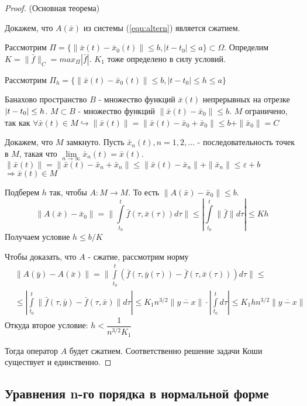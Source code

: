	\begin{proof}
		(Основная теорема)
		
		Докажем, что $A(\bar{x})$ из системы (\ref{equ:altern}) является сжатием.
		
		Рассмотрим $\Pi = \{\|\bar{x}(t) - \bar{x}_0(t)\| \le b, |t-t_0| \le a   \} \subset \Omega$. Определим $K = \|\bar{f}\|_C = max_{\Pi}|\bar{f}|$. $K_1$ тоже определено в силу условий.
		
		Рассмотрим $\Pi_h = \{\|\bar{x}(t) - \bar{x}_0(t)\| \le b, |t-t_0| \le h \le a   \}$
		
		Банахово пространство $B$ - множество функций $\bar{x}(t)$ непрерывных на отрезке $|t-t_0|\hm\le h$. $M \subset B$ - множество функций $\|\bar{x}(t) - \bar{x}_0\| \le b$. $M$ ограничено, так как $\forall \bar{x}(t) \in M \hookrightarrow \|\bar{x}(t)\| = \|\bar{x}(t) - \bar{x}_0 + \bar{x}_0\| \le b + \|\bar{x}_0\| = C$
		
		Докажем, что $M$ замкнуто. Пусть $\bar{x}_n(t), n = 1, 2, \dots$ - последовательность точек в $M$, такая что $\lim\limits_{n\to \infty} \bar{x}_n(t) = \bar{x}(t)$. $\|\bar{x}(t)\| = \|\bar{x}(t) - \bar{x}_n + \bar{x}_n\| \le \|\bar{x}(t) - \bar{x}_n\| + \|\bar{x}_n\| \le \varepsilon + b$ $\Rightarrow \bar{x}(t) \in M$
		
		Подберем $h$ так, чтобы $A:M\to M$. То есть $\|A(\bar{x}) - \bar{x}_0\| \le b$.
		\[
			\|A(\bar{x}) - \bar{x}_0\| = \|\int\limits_{t_0}^t \bar{f}(\tau, \bar{x}(\tau))d\tau\| \le |\int\limits_{t_0}^t \|\bar{f}\|d\tau| \le Kh
		\]
		Получаем условие $h\le b/K$
		
		Чтобы доказать, что $A$ - сжатие, рассмотрим норму
		\begin{align*}
			&\|A(\bar{y}) - A(\bar{x})\| = \|\int\limits_{t_0}^t(\bar{f}(\tau, \bar{y}(\tau)) - \bar{f}(\tau, \bar{x}(\tau)))d\tau\|\le \\ &\le |\int\limits_{t_0}^t \|\bar{f}(\tau, \bar{y}) - \bar{f}(\tau, \bar{x})\|d\tau| \le K_1n^{3/2}\|\overline{y-x}\|\cdot|\int\limits_{t_0}^td\tau| \le K_1hn^{3/2}\|\overline{y-x}\|
		\end{align*}
		Откуда второе условие: $h < \dfrac{1}{n^{3/2}K_1}$
		
		Тогда оператор $A$ будет сжатием. Соответственно решение задачи Коши существует и единственно.
		
	\end{proof}

	\subsection{Уравнения n-го порядка в нормальной форме}
	

